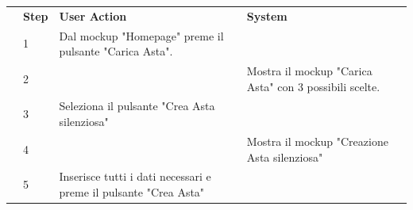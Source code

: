 \begin{table}[H]
\begin{tabularx}{\linewidth}{|p{135pt}|p{25pt}|>{\raggedright\arraybackslash}X|>{\raggedright\arraybackslash}X|}
		\hline \rowcolor[HTML]{DCDCDC}
		\multirow{1}{*}{}{\textbf{\sffamily Description}}                             & \textbf{\sffamily Step}                                                                                                                                                            & \textbf{\sffamily User Action}                                   & \textbf{\sffamily System}                                                          \\
		\cline{2-4}                                                                   & 1                                                                                                                                                                                  & Dal mockup "Homepage" preme il pulsante "Carica Asta".           &                                                                                    \\
		\cline{2-4}                                                                   & 2                                                                                                                                                                                  &                                                                  & Mostra il mockup "Carica Asta" con 3 possibili scelte.                             \\
		\cline{2-4}                                                                   & 3                                                                                                                                                                                  & Seleziona il pulsante "Crea Asta silenziosa"                     &                                                                                    \\
		\cline{2-4}                                                                   & 4                                                                                                                                                                                  &                                                                  & Mostra il mockup "Creazione Asta silenziosa"                                       \\
		\cline{2-4}                                                                   & 5                                                                                                                                                                                  & Inserisce tutti i dati necessari e preme il pulsante "Crea Asta" &                                                                                    \\

\end{tabularx}
\end{table}
